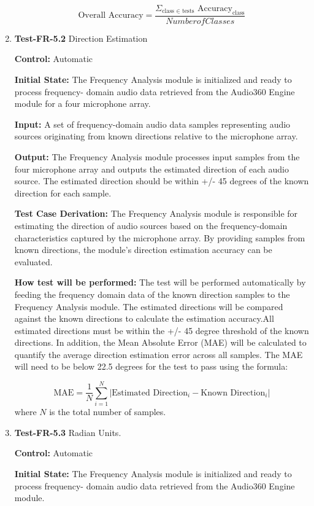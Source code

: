 \documentclass[12pt, titlepage]{article}
\begin{document}
\begin{enumerate}
\[
\text{Overall Accuracy} = \frac{\Sigma_{\text{class } \in \text{  tests}} 
\text{      Accuracy}_{\text{class}}}{Number of Classes}
\]

\item{\textbf{Test-FR-5.2} Direction Estimation\\}

\textbf{Control:} Automatic

\textbf{Initial State:}
The Frequency Analysis module is initialized and ready to process frequency-
domain audio data retrieved from the Audio360 Engine module for a four
microphone array.

\textbf{Input:}
A set of frequency-domain audio data samples representing audio sources
originating from known directions relative to the
microphone array.

\textbf{Output:}
The Frequency Analysis module processes input samples from the four microphone
array and outputs the estimated direction of each audio source. The estimated
direction should be within +/- 45 degrees of the known direction for each sample.

\textbf{Test Case Derivation:}
The Frequency Analysis module is responsible for estimating the direction
of audio sources based on the frequency-domain characteristics captured by
the microphone array. By providing samples from known directions, the module's
direction estimation accuracy can be evaluated.

\textbf{How test will be performed:}
The test will be performed automatically by feeding the frequency
domain data of the known direction samples to the Frequency Analysis module.
The estimated directions will be compared against the known directions to
calculate the estimation accuracy.All estimated directions
must be within the +/- 45 degree threshold of the known directions. In addition,
the Mean Absolute Error (MAE) will be calculated to quantify the average
direction estimation error across all samples. The MAE will need to be below
22.5 degrees for the test to pass using the formula:

\[
\text{MAE} = \frac{1}{N} \sum_{i=1}^{N} | \text{Estimated Direction}_i - \text{Known Direction}_i |
\]
where \(N\) is the total number of samples.

\item{\textbf{Test-FR-5.3} Radian Units.\\}

\textbf{Control:} Automatic

\textbf{Initial State:}
The Frequency Analysis module is initialized and ready to process frequency-
domain audio data retrieved from the Audio360 Engine module.


\end{enumerate}
\end{document}
